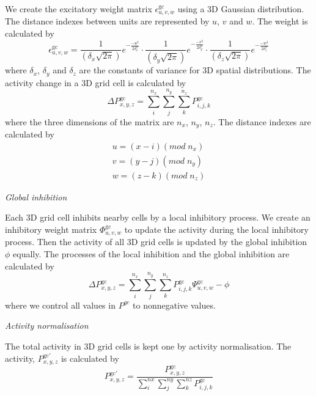 We create the excitatory weight matrix $\epsilon_{u,v,w}^{\text{gc}}$ using a 3D Gaussian distribution. 
The distance indexes between units are represented by $u$, $v$ and $w$. 
The weight is calculated by
%
\begin{equation}\label{eq:weight}
	\epsilon_{u,v,w}^{\text{gc}} = 
		\frac{1}{(\delta_x \sqrt{2 \pi})} e^{-\frac{-u^2}{2\delta_x^2}} \cdot
		\frac{1}{(\delta_y \sqrt{2 \pi})} e^{-\frac{-v^2}{2\delta_y^2}}
		\cdot \frac{1}{(\delta_z \sqrt{2 \pi})} e^{-\frac{-w^2}{2\delta_z^2}}
\end{equation}
%
where $\delta_x$, $\delta_y$ and $\delta_z$ are the constants of variance for 3D spatial distributions.
The activity change in a 3D grid cell is calculated by
\begin{equation}\label{eq:activity_change}
	\Delta P_{x,y,z}^{\text{gc}} = \sum_{i}^{n_x} \sum_{j}^{n_y} \sum_{k}^{n_z} P_{i,j,k}^{\text{gc}}
\end{equation}
%
where the three dimensions of the matrix are $n_x$, $n_y$, $n_z$.
The distance indexes are calculated by
\begin{equation}
\begin{aligned}
	u = (x - i) (mod \; n_x) \\
	v = (y - j) (mod \; n_y) \\
	w = (z - k) (mod \; n_z)
\end{aligned}
\end{equation}

\textit{Global inhibition}

Each 3D grid cell inhibits nearby cells by a local inhibitory process. 
We create an inhibitory weight matrix $\Phi_{u,v,w}^{\text{gc}}$ to update the activity during the local inhibitory process. 
Then the activity of all 3D grid cells is updated by the global inhibition $\phi$ equally. The processes of the local inhibition and the global inhibition are calculated by
%
\begin{equation}
	\Delta P_{x,y,z}^{\text{gc}} = 
		\sum_{i}^{n_x}
		\sum_{j}^{n_y}
		\sum_{k}^{n_z}
		P_{i,j,k}^{\text{gc}}
		\Psi_{u,v,w}^{\text{gc}} - \phi
\end{equation}
% 
where we control all values in $P^{gc}$ to nonnegative values.


\textit{Activity normalisation}

The total activity in 3D grid cells is kept one by activity normalisation. 
The activity, $P_{x,y,z}^{\text{gc}'}$ is calculated by
%
\begin{equation}
	P_{x,y,z}^{\text{gc}'} = 
		\frac{P_{x,y,z}^{\text{gc}}}
			{
				\sum_{i}^{nx}
				\sum_{j}^{ny}
				\sum_{k}^{nz}
				P_{i,j,k}^{\text{gc}}
			}
\end{equation}

